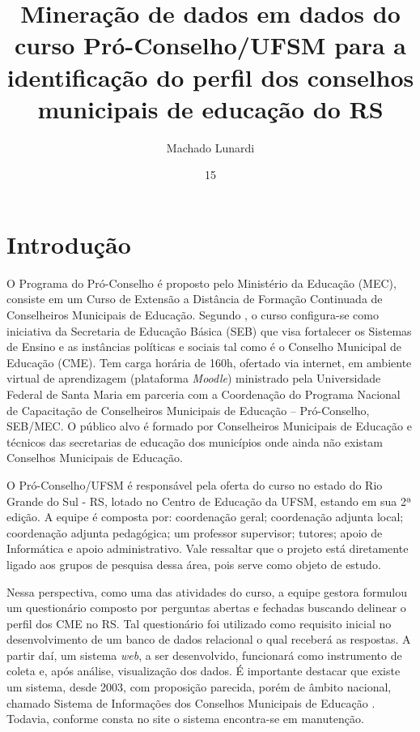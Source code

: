 \documentclass[projtg]{mdtufsm}
\title{Mineração de dados em dados do curso Pró-Conselho/UFSM para a identificação do perfil dos conselhos municipais de educação do RS}
\author{Machado Lunardi}{Gabriel}
\institute{Centro de Tecnologia}
\date{15}{Agosto}{2014}
\begin{document}
\maketitle
\setlength{\baselineskip}{1.5\baselineskip}

\chapter{Introdução}

O Programa do Pró-Conselho é proposto pelo Ministério da Educação (MEC), consiste em um Curso de Extensão a Distância de Formação Continuada de Conselheiros Municipais de Educação. Segundo \cite{Lunardi-2014}, o curso configura-se como iniciativa da Secretaria de Educação Básica (SEB) que visa fortalecer os Sistemas de Ensino e as instâncias políticas e sociais tal como é o Conselho Municipal de Educação (CME). Tem carga horária de 160h, ofertado via internet, em ambiente virtual de aprendizagem (plataforma \textit{Moodle}) ministrado pela Universidade Federal de Santa Maria em parceria com a Coordenação do Programa Nacional de Capacitação de Conselheiros Municipais de Educação – Pró-Conselho, SEB/MEC. O público alvo é formado por Conselheiros Municipais de Educação e técnicos das secretarias de educação dos municípios onde ainda não existam Conselhos Municipais de Educação. 

O Pró-Conselho/UFSM é responsável pela oferta do curso no estado do Rio Grande do Sul - RS, lotado no Centro de Educação da UFSM, estando em sua 2ª edição. A equipe é composta por: coordenação geral; coordenação adjunta local; coordenação adjunta pedagógica; um professor supervisor; tutores; apoio de Informática e apoio administrativo. Vale ressaltar que o projeto está diretamente ligado aos grupos de pesquisa dessa área, pois serve como objeto de estudo. 

Nessa perspectiva, como uma das atividades do curso, a equipe gestora formulou um questionário composto por perguntas abertas e fechadas buscando delinear o perfil dos CME no RS. Tal questionário foi utilizado como requisito inicial no desenvolvimento de um banco de dados relacional o qual receberá as respostas. A partir daí, um sistema {\it web}, a ser desenvolvido, funcionará como instrumento de coleta e, após análise, visualização dos dados. É importante destacar que existe um sistema, desde 2003, com proposição parecida, porém de âmbito nacional, chamado Sistema de Informações dos Conselhos Municipais de Educação \cite{sicme-site}. Todavia, conforme consta no site \cite{mec-site} o sistema encontra-se em manutenção. 
\end{document}
